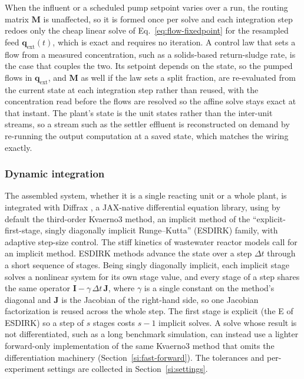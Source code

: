 \documentclass{article}
\begin{document}
When the influent or a scheduled pump setpoint varies over a run, the routing matrix \(\mathbf{M}\) is unaffected, so it is formed once per solve and each integration step redoes only the cheap linear solve of Eq.~\eqref{eq:flow-fixedpoint} for the resampled feed \(\mathbf{q}_{\mathrm{ext}}(t)\), which is exact and requires no iteration. A control law that sets a flow from a measured concentration, such as a solids-based return-sludge rate, is the case that couples the two. Its setpoint depends on the state, so the pumped flows in \(\mathbf{q}_{\mathrm{ext}}\), and \(\mathbf{M}\) as well if the law sets a split fraction, are re-evaluated from the current state at each integration step rather than reused, with the concentration read before the flows are resolved so the affine solve stays exact at that instant. The plant's state is the unit states rather than the inter-unit streams, so a stream such as the settler effluent is reconstructed on demand by re-running the output computation at a saved state, which matches the wiring exactly.

\subsubsection{Dynamic integration}
\label{sec:methods-integration}

The assembled system, whether it is a single reacting unit or a whole plant, is integrated with Diffrax \citep{kidger2021on}, a JAX-native differential equation library, using by default the third-order Kvaerno3 method, an implicit method of the ``explicit-first-stage, singly diagonally implicit Runge--Kutta'' (ESDIRK) family, with adaptive step-size control. The stiff kinetics of wastewater reactor models call for an implicit method. ESDIRK methods advance the state over a step \(\Delta t\) through a short sequence of stages. Being singly diagonally implicit, each implicit stage solves a nonlinear system for its own stage value, and every stage of a step shares the same operator \(\mathbf{I}-\gamma\,\Delta t\,\mathbf{J}\), where \(\gamma\) is a single constant on the method's diagonal and \(\mathbf{J}\) is the Jacobian of the right-hand side, so one Jacobian factorization is reused across the whole step. The first stage is explicit (the E of ESDIRK) so a step of \(s\) stages costs \(s-1\) implicit solves. A solve whose result is not differentiated, such as a long benchmark simulation, can instead use a lighter forward-only implementation of the same Kvaerno3 method that omits the differentiation machinery (Section~\ref{si:fast-forward}). The tolerances and per-experiment settings are collected in Section~\ref{si:settings}.
\end{document}
